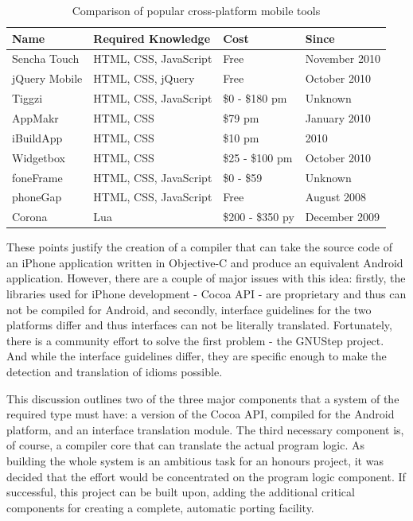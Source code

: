 \documentclass[parskip]{cs4rep}
\begin{document}
\begin{table}
    \label{tab:crossPlatformTools}
    \caption{Comparison of popular cross-platform mobile tools \cite{P4}}
    \centering
    \begin{tabular}{ | l | p{4.4cm} | p{2.6cm} | p{3cm} |}
    \hline
    Name & Required Knowledge & Cost & Since \\ \hline
    Sencha Touch & HTML, CSS, JavaScript & Free & November 2010 \\ \hline
    jQuery Mobile & HTML, CSS, jQuery & Free & October 2010 \\ \hline
    Tiggzi & HTML, CSS, JavaScript & \$0 - \$180 pm & Unknown \\ \hline
    AppMakr & HTML, CSS & \$79 pm & January 2010 \\ \hline
    iBuildApp & HTML, CSS & \$10 pm & 2010 \\ \hline
    Widgetbox & HTML, CSS & \$25 - \$100 pm & October 2010 \\ \hline
    foneFrame & HTML, CSS, JavaScript & \$0 - \$59 & Unknown \\ \hline
    phoneGap & HTML, CSS, JavaScript & Free & August 2008 \\ \hline
    Corona & Lua & \$200 - \$350 py & December 2009 \\ \hline
    \end{tabular}
\end{table}

These points justify the creation of a compiler that can take the source code of
an iPhone application written in Objective-C and produce an equivalent Android
application. However, there are a couple of major issues with this idea:
firstly, the libraries used for iPhone development - Cocoa API - are proprietary
and thus can not be compiled for Android, and secondly, interface guidelines for
the two platforms differ and thus interfaces can not be literally translated.
Fortunately, there is a community effort to solve the first problem - the
GNUStep project. And while the interface guidelines differ, they are
specific enough to make the detection and translation of idioms possible.

This discussion outlines two of the three major components that a system of the required type must have: a version of the Cocoa API, compiled for the Android platform, and an interface translation module. The third necessary component is, of course, a compiler core that can translate the actual program logic. As building the whole system is an ambitious task for an honours project, it was decided that the effort would be concentrated on the program logic component. If successful, this project can be built upon, adding the additional critical components for creating a complete, automatic porting facility.
\end{document}
